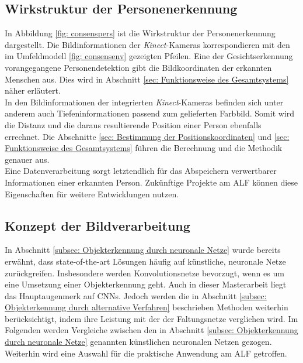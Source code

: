 	\subsection{Wirkstruktur der Personenerkennung}
	\label{subsec: Wirkstrukur Personenerkennung}
		
		
		
	
	
	In Abbildung \ref{fig: consenspers} ist die Wirkstruktur der Personenerkennung dargestellt. Die Bildinformationen der \textit{Kinect}-Kameras korrespondieren mit den im Umfeldmodell \ref{fig: consensenv} gezeigten Pfeilen. Eine der Gesichtserkennung vorangegangene Personendetektion gibt die Bildkoordinaten der erkannten Menschen aus. Dies wird in Abschnitt \ref{sec: Funktionsweise des Gesamtsystems} näher erläutert.\\
		
	In den Bildinformationen der integrierten \textit{Kinect}-Kameras befinden sich unter anderem auch Tiefeninformationen passend zum gelieferten Farbbild. Somit wird die Distanz und die daraus resultierende Position einer Person ebenfalls errechnet. Die Abschnitte \ref{sec: Bestimmung der Positionskoordinaten} und \ref{sec: Funktionsweise des Gesamtsystems} führen die Berechnung und die Methodik genauer aus.\\
		
	Eine Datenverarbeitung sorgt letztendlich für das Abspeichern verwertbarer Informationen einer erkannten Person. Zukünftige Projekte am ALF können diese Eigenschaften für weitere Entwicklungen nutzen.\\   
		
	\subsection{Konzept der Bildverarbeitung}
	\label{subsec: Auswahl und Training der verwendeten neuronalen Netze}
		
	In Abschnitt \ref{subsec: Objekterkennung durch neuronale Netze} wurde bereits erwähnt, dass state-of-the-art Lösungen häufig auf künstliche, neuronale Netze zurückgreifen. Insbesondere werden Konvolutionsnetze bevorzugt, wenn es um eine Umsetzung einer Objekterkennung geht. Auch in dieser Masterarbeit liegt das Hauptaugenmerk auf CNNs. Jedoch werden die in Abschnitt \ref{subsec: Objekterkennung durch alternative Verfahren} beschrieben Methoden weiterhin berücksichtigt, indem ihre Leistung mit der der Faltungsnetze verglichen wird. Im Folgenden werden Vergleiche zwischen den in Abschnitt \ref{subsec: Objekterkennung durch neuronale Netze} genannten künstlichen neuronalen Netzen gezogen. Weiterhin wird eine Auswahl für die praktische Anwendung am ALF getroffen. \\
		
